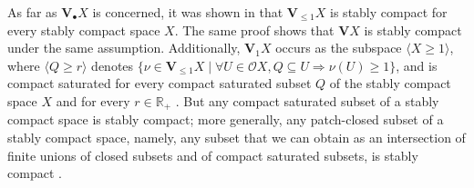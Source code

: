 \documentclass[preprint,12pt]{elsarticle}
\newcommand\eqdef{\mathrel{\buildrel \text{def}\over=}}
\newcommand{\Rp}{\mathbb{R}_+}
\newcommand\limp{\mathrel{\Rightarrow}}
\newcommand\Val{{\mathbf V}}
\newcommand\Open{{\mathcal O}}
\begin{document}
As far as $\Val_\bullet X$ is concerned, it was shown in
\cite[Theorem~39]{AMJK:scs:prob} that $\Val_{\leq 1} X$ is stably
compact for every stably compact space $X$.  The same proof shows that
$\Val X$ is stably compact under the same assumption.  Additionally,
$\Val_1 X$ occurs as the subspace $\langle X \geq 1\rangle$, where
$\langle Q \geq r \rangle$ denotes
$\{\nu \in \Val_{\leq 1} X \mid \forall U \in \Open X, Q \subseteq U
\limp \nu (U) \geq 1\}$, and is compact saturated for every compact
saturated subset $Q$ of the stably compact space $X$ and for every
$r \in \Rp$ \cite[Lemma 6.6]{GL:duality}.  But any compact saturated
subset of a stably compact space is stably compact; more generally,
any patch-closed subset of a stably compact space, namely, any subset
that we can obtain as an intersection of finite unions of closed
subsets and of compact saturated subsets, is stably compact
\cite[Proposition~2.16]{Jung:scs:prob}.

\end{document}
